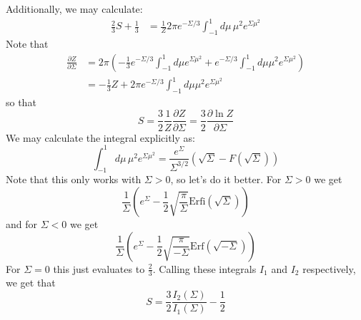 \documentclass[reqno]{article}
\begin{document}
Additionally, we may calculate:
\begin{equation}
\begin{split}
    \frac23 S + \frac13
    &=
    \frac{1}{Z} 2 \pi e^{-\Sigma / 3} \int_{-1}^1 d\mu \, \mu^2 e^{\Sigma \mu^2} 
\end{split}
\end{equation}
Note that
\begin{equation}
\begin{split}
    \frac{\partial Z}{\partial \Sigma}
    &=
    2 \pi \left( 
        -\frac13 e^{-\Sigma / 3} \int_{-1}^1 d\mu e^{\Sigma \mu^2} 
        + e^{-\Sigma / 3}\int_{-1}^1 d\mu \mu^2 e^{\Sigma \mu^2}
    \right) \\
    &= -\frac13 Z + 2 \pi e^{-\Sigma / 3}\int_{-1}^1 d\mu \mu^2 e^{\Sigma \mu^2}
\end{split}
\end{equation}
so that
\begin{equation}
    S
    =
    \frac32 \frac{1}{Z} \frac{\partial Z}{\partial \Sigma}
    =
    \frac32 \frac{\partial \ln Z}{\partial \Sigma}
\end{equation}
We may calculate the integral explicitly as:
\begin{equation}
    \int_{-1}^1 d\mu \, \mu^2 e^{\Sigma \mu^2}
    =
    \frac{e^\Sigma}{\Sigma^{3/2}} \left( \sqrt{\Sigma} - F \left(\sqrt{\Sigma}\right) \right)
\end{equation}
Note that this only works with $\Sigma > 0$, so let's do it better. 
For $\Sigma > 0$ we get
\begin{equation}
    \frac{1}{\Sigma} \left(
        e^\Sigma
        -
        \frac12 \sqrt{\frac{\pi}{\Sigma}}
        \text{Erfi} \left( \sqrt{\Sigma} \right)
    \right)
\end{equation}
and for $\Sigma < 0$ we get
\begin{equation}
    \frac{1}{\Sigma} \left(
        e^\Sigma
        -
        \frac12 \sqrt{\frac{\pi}{-\Sigma}}
        \text{Erf} \left( \sqrt{-\Sigma} \right)
    \right)
\end{equation}
For $\Sigma = 0$ this just evaluates to $\frac23$.
Calling these integrals $I_1$ and $I_2$ respectively, we get that
\begin{equation}
    S = \frac32 \frac{I_2(\Sigma)}{I_1(\Sigma)} - \frac12
\end{equation}
\end{document}
